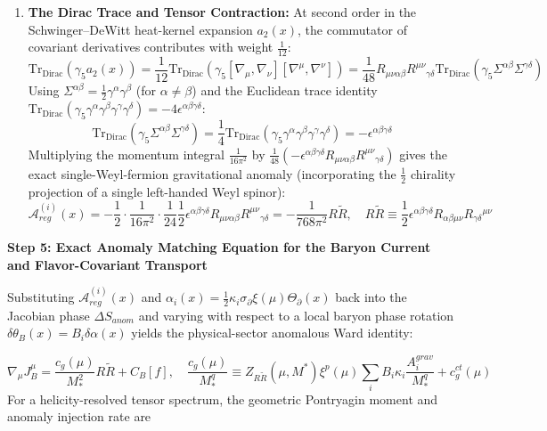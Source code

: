\documentclass[aps,prd,onecolumn,superscriptaddress,nofootinbib,longbibliography,10pt]{revtex4-2}
\begin{document}
{{\begin{enumerate}
\item \textbf{The Dirac Trace and Tensor Contraction:} At second order in the Schwinger–DeWitt heat-kernel expansion \(a_2(x)\), the commutator of covariant derivatives contributes with weight \(\frac{1}{12}\):
    \[ \text{Tr}_{\text{Dirac}}(\gamma_5 a_2(x)) = \frac{1}{12}\text{Tr}_{\text{Dirac}}\left(\gamma_5[\nabla_\mu,\nabla_\nu][\nabla^\mu,\nabla^\nu]\right) = \frac{1}{48}R_{\mu\nu\alpha\beta}R^{\mu\nu}{}_{\gamma\delta}\text{Tr}_{\text{Dirac}}\left(\gamma_5\Sigma^{\alpha\beta}\Sigma^{\gamma\delta}\right) \]
    Using \(\Sigma^{\alpha\beta} = \frac{1}{2}\gamma^\alpha\gamma^\beta\) (for \(\alpha \neq \beta\)) and the Euclidean trace identity \(\text{Tr}_{\text{Dirac}}(\gamma_5\gamma^\alpha\gamma^\beta\gamma^\gamma\gamma^\delta) = -4\epsilon^{\alpha\beta\gamma\delta}\):
    \[ \text{Tr}_{\text{Dirac}}\left(\gamma_5\Sigma^{\alpha\beta}\Sigma^{\gamma\delta}\right) = \frac{1}{4}\text{Tr}_{\text{Dirac}}\left(\gamma_5\gamma^\alpha\gamma^\beta\gamma^\gamma\gamma^\delta\right) = -\epsilon^{\alpha\beta\gamma\delta} \]
    Multiplying the momentum integral \(\frac{1}{16\pi^2}\) by \(\frac{1}{48}(-\epsilon^{\alpha\beta\gamma\delta}R_{\mu\nu\alpha\beta}R^{\mu\nu}{}_{\gamma\delta})\) gives the exact single-Weyl-fermion gravitational anomaly (incorporating the \(\frac{1}{2}\) chirality projection of a single left-handed Weyl spinor):
    \[ \mathcal{A}_{reg}^{(i)}(x) = -\frac{1}{2}\cdot\frac{1}{16\pi^2}\cdot\frac{1}{24}\frac{1}{2}\epsilon^{\alpha\beta\gamma\delta}R_{\mu\nu\alpha\beta}R^{\mu\nu}{}_{\gamma\delta} = -\frac{1}{768\pi^2}R\tilde{R}, \quad R\tilde{R} \equiv \frac{1}{2}\epsilon^{\alpha\beta\gamma\delta}R_{\alpha\beta\mu\nu}R_{\gamma\delta}{}^{\mu\nu} \]
  
\end{enumerate}


  \textbf{Step 5: Exact Anomaly Matching Equation for the Baryon Current and Flavor-Covariant Transport}


  Substituting \(\mathcal{A}_{reg}^{(i)}(x)\) and \(\alpha_i(x) = \frac{1}{2}\kappa_i\sigma_\partial\xi(\mu)\Theta_\partial(x)\) back into the Jacobian phase \(\Delta S_{anom}\) and varying with respect to a local baryon phase rotation \(\delta\theta_B(x) = B_i\delta\alpha(x)\) yields the physical-sector anomalous Ward identity:


  \[ \nabla_\mu J_B^\mu = \frac{c_g(\mu)}{M_*^2}R\tilde{R} + C_B[f], \quad \frac{c_g(\mu)}{M_*^q} \equiv Z_{R\tilde{R}}(\mu,M^*)\xi^p(\mu)\sum_i B_i\kappa_i\frac{A_i^{grav}}{M_*^q} + c_g^{ct}(\mu) \]
  For a helicity-resolved tensor spectrum, the geometric Pontryagin moment and anomaly injection rate are


}}
\end{document}
